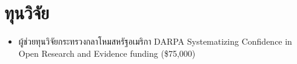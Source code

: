 \section{\sc ทุนวิจัย}

\begin{itemize}[leftmargin=0cm, label={}]
\itemsep0em

\item ผู้ช่วยทุนวิจัยกระทรวงกลาโหมสหรัฐอเมริกา DARPA Systematizing Confidence in Open Research and Evidence funding (\$75,000)

\end{itemize}
